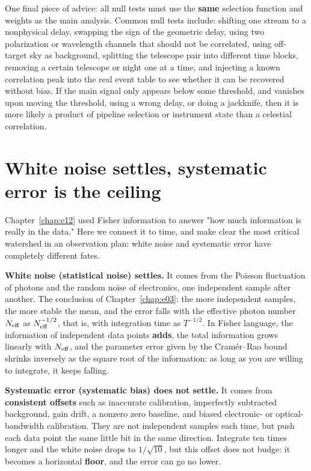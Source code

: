 One final piece of advice: all null tests must use the \textbf{same} selection function and weights as the main analysis. Common null tests include: shifting one stream to a nonphysical delay, swapping the sign of the geometric delay, using two polarization or wavelength channels that should not be correlated, using off-target sky as background, splitting the telescope pair into different time blocks, removing a certain telescope or night one at a time, and injecting a known correlation peak into the real event table to see whether it can be recovered without bias. If the main signal only appears below some threshold, and vanishes upon moving the threshold, using a wrong delay, or doing a jackknife, then it is more likely a product of pipeline selection or instrument state than a celestial correlation.

\section{White noise settles, systematic error is the ceiling}
\label{sec:e14-floor}

Chapter~\ref{chap:e12} used Fisher information to answer "how much information is really in the data." Here we connect it to time, and make clear the most critical watershed in an observation plan: white noise and systematic error have completely different fates.

\textbf{White noise (statistical noise) settles.} It comes from the Poisson fluctuation of photons and the random noise of electronics, one independent sample after another. The conclusion of Chapter~\ref{chap:e03}: the more independent samples, the more stable the mean, and the error falls with the effective photon number $N_{\rm eff}$ as $N_{\rm eff}^{-1/2}$, that is, with integration time as $T^{-1/2}$. In Fisher language, the information of independent data points \textbf{adds}, the total information grows linearly with $N_{\rm eff}$, and the parameter error given by the Cramér--Rao bound shrinks inversely as the square root of the information: as long as you are willing to integrate, it keeps falling.

\textbf{Systematic error (systematic bias) does not settle.} It comes from \textbf{consistent offsets} such as inaccurate calibration, imperfectly subtracted background, gain drift, a nonzero zero baseline, and biased electronic- or optical-bandwidth calibration. They are not independent samples each time, but push each data point the same little bit in the same direction. Integrate ten times longer and the white noise drops to $1/\sqrt{10}$, but this offset does not budge: it becomes a horizontal \textbf{floor}, and the error can go no lower.

